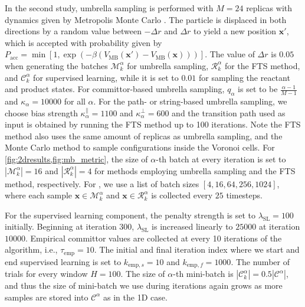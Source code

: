 \documentclass{article}
\numberwithin{equation}{section}
\def\*#1{\mathbf{#1}}
\theoremstyle{definition}
\theoremstyle{remark}
\begin{document}
In the second study, umbrella sampling is performed with $M=24$ replicas with dynamics given by Metropolis Monte Carlo \cite{metropolis1949monte,frenkel2001understanding}.
The particle is displaced in both directions by a random value between $ - \Delta r $ and $ \Delta r $ to yield a new position $ \* x' $, which is accepted with probability given by $P_{\text{acc}} = \min \left[ 1 , \exp \left( -\beta ( V_\mathrm{MB}(\* x') - V_\mathrm{MB}(\* x) ) \right)  \right] $.
The value of $ \Delta r $ is $ 0.05 $ when generating the batches $ \mathcal{M}_{k}^{\alpha} $ for umbrella sampling, $\mathcal{R}_{k}^{\alpha} $ for the FTS method, and $ \mathcal{C}_{k}^{\alpha} $ for supervised learning, while it is set to $ 0.01 $ for sampling the reactant and product states. For committor-based umbrella sampling, $q_\alpha $ is set to be $ \frac{\alpha-1}{M-1}$ and $ \kappa_\alpha = 10000 $ for all $ \alpha $. For the path- or string-based umbrella sampling, we choose bias strength $\kappa_\alpha^\parallel =1100$ and $\kappa_\alpha^\bot=600$ and the transition path used as input is obtained by running the FTS method up to 100 iterations.
Note the FTS method also uses the same amount of replicas as umbrella sampling, and the Monte Carlo method to sample configurations inside the Voronoi cells.
For \cref{fig:2dresults,fig:mb_metric}, the size of $\alpha$-th batch at every iteration is set to $|\mathcal{M}_k^\alpha|=16$ and $|\mathcal{R}_k^\alpha|=4$ for methods employing umbrella sampling and the FTS method, respectively. For , we use a list of batch sizes $[4,16,64,256,1024]$, where each sample $\* x \in \mathcal{M}_k^\alpha$ and $\* x \in \mathcal{R}_k^\alpha$ is collected every $ 25 $ timesteps. 


For the supervised learning component, the penalty strength is set to $\lambda_\mathrm{SL} = 100$ initially.
Beginning at iteration $ 300 $, $ \lambda_\mathrm{SL} $ is increased linearly to $ 25000 $ at iteration $ 10000 $.
Empirical committor values are collected at every 10 iterations of the algorithm, i.e., $\tau_\mathrm{emp} = 10$.
The initial and final iteration index where we start and end supervised learning is set to $k_{\mathrm{emp},s}=10$ and $k_{\mathrm{emp},f}=1000$.  
The number of trials for every window $H = 100$. 
The size of $\alpha$-th mini-batch is $|\mathcal{C}_k^\alpha| = 0.5 |\mathcal{C}^\alpha|$, and thus the size of mini-batch we use during iterations again grows as more samples are stored into $\mathcal{C}^\alpha$ as in the 1D case.
\end{document}
